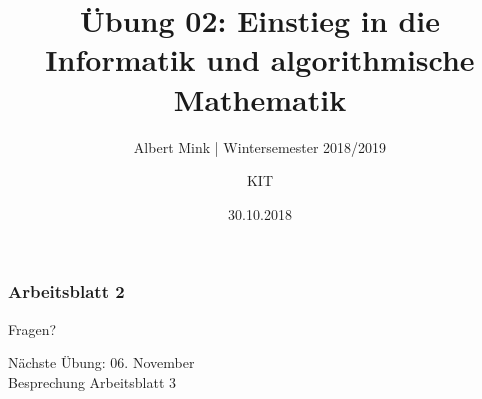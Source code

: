 \documentclass[c,18pt]{beamer}
\date{30.10.2018}
\title[Übung 02: Einstieg in die Informatik und algorithmische]
  {Übung 02: Einstieg in die Informatik und algorithmische \\ Mathematik}
\subtitle{Albert Mink | Wintersemester 2018/2019}
\author[Albert Mink, ]{KIT}
\institute[Institut für Angewandte und Numerische Mathematik (IANM)]{Institut für Angewandte und Numerische Mathematik}
\begin{document}
\begin{frame}
  \maketitle
\end{frame}
\begin{frame}
  \frametitle{Arbeitsblatt 2}%
\tableofcontents
\end{frame}
\setcounter{exercise}{5}



\setcounter{exercise}{6}




\setcounter{exercise}{7}







\setcounter{exercise}{8}


\begin{frame}
\centering
\Huge\textcolor{KITgreen}{Fragen?}
\vspace{2cm}

{\LARGE
N\"achste \"Ubung: 06. November\\
Besprechung Arbeitsblatt 3
}
\end{frame}


\end{document}
